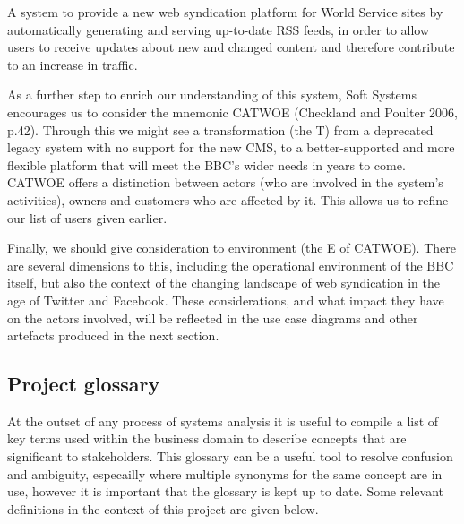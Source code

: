 \documentclass[a4paper]{article}
\begin{document}
\begin{displayquote}
A system to provide a new web syndication platform for World Service sites by automatically generating and serving up-to-date RSS feeds, in order to allow users to receive updates about new and changed content and therefore contribute to an increase in traffic.
\end{displayquote}

As a further step to enrich our understanding of this system, Soft Systems encourages us to consider the mnemonic CATWOE (Checkland and Poulter 2006, p.42). Through this we might see a transformation (the T) from a deprecated legacy system with no support for the new CMS, to a better-supported and more flexible platform that will meet the BBC's wider needs in years to come. CATWOE offers a distinction between actors (who are involved in the system's activities), owners and customers who are affected by it. This allows us to refine our list of users given earlier.

Finally, we should give consideration to environment (the E of CATWOE). There are several dimensions to this, including the operational environment of the BBC itself, but also the context of the changing landscape of web syndication in the age of Twitter and Facebook. These considerations, and what impact they have on the actors involved, will be reflected in the use case diagrams and other artefacts produced in the next section.

\subsection{Project glossary}

At the outset of any process of systems analysis it is useful to compile a list of key terms used within the business domain to describe concepts that are significant to stakeholders. This glossary can be a useful tool to resolve confusion and ambiguity, especailly where multiple synonyms for the same concept are in use, however it is important that the glossary is kept up to date. Some relevant definitions in the context of this project are given below.
\end{document}
